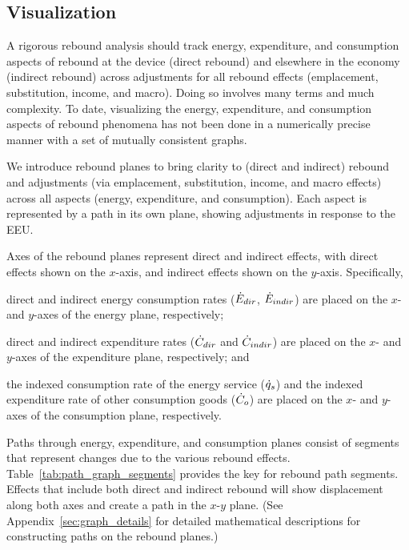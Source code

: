 \documentclass[12pt]{article}\usepackage[]{graphicx}\usepackage[]{xcolor}
\begin{document}
\subsection{Visualization}
\label{sec:path_graphs}

A rigorous rebound analysis should track
energy, expenditure, and consumption
aspects of rebound 
at the device (direct rebound) and elsewhere in the economy (indirect rebound)
across adjustments for all rebound effects
(emplacement, substitution, income, and macro). 
Doing so involves many terms and much complexity.
To date, visualizing the energy, expenditure, and consumption 
aspects of rebound phenomena has not been 
done in a numerically precise manner 
with a set of mutually consistent graphs.

We introduce rebound planes
to bring clarity to
(direct and indirect) rebound and 
adjustments (via emplacement, substitution, income, and macro effects)
across all aspects (energy, expenditure, and consumption).
Each aspect is represented by a path in its own plane,
showing adjustments in response to the EEU.

Axes of the rebound planes
represent direct and indirect effects, with 
direct effects shown on the $x$-axis, and 
indirect effects shown on the $y$-axis.
Specifically, 
%
\begin{enumerate*}[label={(\roman*)}]
	
  \item direct and indirect energy consumption rates ($\dot{E}_{dir}$, $\dot{E}_{indir}$) are placed on
        the $x$- and $y$-axes of the energy plane, respectively;
  
  \item direct and indirect expenditure rates ($\dot{C}_{dir}$ and $\dot{C}_{indir}$) are placed on 
        the $x$- and $y$-axes of the expenditure plane, respectively; and
  
  \item the indexed consumption rate of the energy service ($\dot{q}_s$) and
        the indexed expenditure rate of other consumption goods ($\dot{C}_o$) are placed on
        the $x$- and $y$-axes of the consumption plane, respectively.
    
\end{enumerate*}
%
Paths through energy, expenditure, and consumption planes
consist of segments that represent changes due to the various rebound effects.
Table~\ref{tab:path_graph_segments} provides the key for rebound path segments.
Effects that include both direct and indirect rebound
will show displacement along both axes and 
create a path in the $x$-$y$ plane.
(See Appendix~\ref{sec:graph_details} for 
detailed mathematical descriptions for constructing paths on the rebound planes.)
\end{document}
